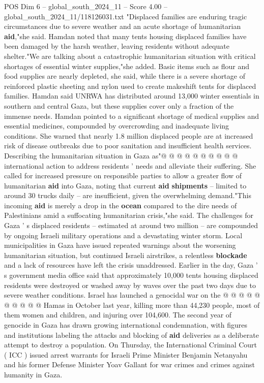 \begin{textsample}{POS Dim 6 – global\_south\_2024\_11 – Score 4.00 – global\_south\_2024\_11/118126031.txt}  \label{ex:f6_pos_335}
"Displaced families are enduring tragic circumstances due to severe weather and an acute shortage of humanitarian \textbf{aid},"she said.
Hamdan noted that many tents housing displaced families have been damaged by the harsh weather, leaving residents without adequate shelter."We are talking about a catastrophic humanitarian situation with critical shortages of essential winter supplies,"she added.
Basic items such as flour and food supplies are nearly depleted, she said, while there is a severe shortage of reinforced plastic sheeting and nylon used to create makeshift tents for displaced families.
Hamdan said UNRWA has distributed around 13,000 winter essentials in southern and central Gaza, but these supplies cover only a fraction of the immense needs.
Hamdan pointed to a significant shortage of medical supplies and essential medicines, compounded by overcrowding and inadequate living conditions.
She warned that nearly 1.8 million displaced people are at increased risk of disease outbreaks due to poor sanitation and insufficient health services.
Describing the humanitarian situation in Gaza as"@ @ @ @ @ @ @ @ @ @ international action to address residents ' needs and alleviate their suffering.
She called for increased pressure on responsible parties to allow a greater flow of humanitarian \textbf{aid} into Gaza, noting that current \textbf{aid} \textbf{shipments} -- limited to around 30 trucks daily -- are insufficient, given the overwhelming demand."This incoming \textbf{aid} is merely a drop in the \textbf{ocean} compared to the dire needs of Palestinians amid a suffocating humanitarian crisis,"she said.
The challenges for Gaza ' s displaced residents -- estimated at around two million -- are compounded by ongoing Israeli military operations and a devastating winter storm.
Local municipalities in Gaza have issued repeated warnings about the worsening humanitarian situation, but continued Israeli airstrikes, a relentless \textbf{blockade} and a lack of resources have left the crisis unaddressed.
Earlier in the day, Gaza ' s government media office said that approximately 10,000 tents housing displaced residents were destroyed or washed away by waves over the past two days due to severe weather conditions.
Israel has launched a genocidal war on the @ @ @ @ @ @ @ @ @ @ Hamas in October last year, killing more than 44,230 people, most of them women and children, and injuring over 104,600.
The second year of genocide in Gaza has drawn growing international condemnation, with figures and institutions labeling the attacks and blocking of \textbf{aid} deliveries as a deliberate attempt to destroy a population.
On Thursday, the International Criminal Court ( ICC ) issued arrest warrants for Israeli Prime Minister Benjamin Netanyahu and his former Defense Minister Yoav Gallant for war crimes and crimes against humanity in Gaza.

\end{textsample}
